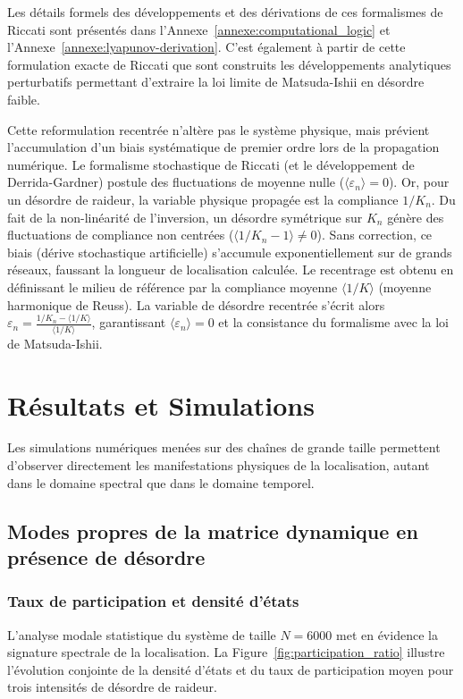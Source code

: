 \documentclass[11pt, a4paper, twoside]{article}
\begin{document}
Les détails formels des développements et des dérivations de ces formalismes de Riccati sont présentés dans l'Annexe~\ref{annexe:computational_logic} et l'Annexe~\ref{annexe:lyapunov-derivation}. C'est également à partir de cette formulation exacte de Riccati que sont construits les développements analytiques perturbatifs permettant d'extraire la loi limite de Matsuda-Ishii en désordre faible.

Cette reformulation recentrée n'altère pas le système physique, mais prévient l'accumulation d'un biais systématique de premier ordre lors de la propagation numérique. Le formalisme stochastique de Riccati (et le développement de Derrida-Gardner) postule des fluctuations de moyenne nulle ($\langle \varepsilon_n \rangle = 0$). Or, pour un désordre de raideur, la variable physique propagée est la compliance $1/K_n$. Du fait de la non-linéarité de l'inversion, un désordre symétrique sur $K_n$ génère des fluctuations de compliance non centrées ($\langle 1/K_n - 1 \rangle \neq 0$). Sans correction, ce biais (dérive stochastique artificielle) s'accumule exponentiellement sur de grands réseaux, faussant la longueur de localisation calculée. Le recentrage est obtenu en définissant le milieu de référence par la compliance moyenne $\langle 1/K \rangle$ (moyenne harmonique de Reuss). La variable de désordre recentrée s'écrit alors $\varepsilon_n = \frac{1/K_n - \langle 1/K \rangle}{\langle 1/K \rangle}$, garantissant $\langle \varepsilon_n \rangle = 0$ et la consistance du formalisme avec la loi de Matsuda-Ishii.

\section{Résultats et Simulations}

Les simulations numériques menées sur des chaînes de grande taille permettent d'observer directement les manifestations physiques de la localisation, autant dans le domaine spectral que dans le domaine temporel.

\FloatBarrier
\subsection{Modes propres de la matrice dynamique en présence de désordre}

\subsubsection{Taux de participation et densité d'états}
L'analyse modale statistique du système de taille $N=6000$ met en évidence la signature spectrale de la localisation. La Figure~\ref{fig:participation_ratio} illustre l'évolution conjointe de la densité d'états et du taux de participation moyen pour trois intensités de désordre de raideur.
\end{document}
